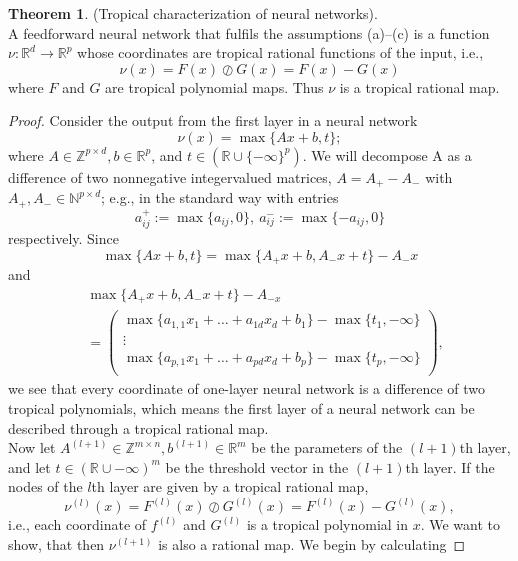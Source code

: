 \documentclass{article}
\theoremstyle{definition}
\newtheorem{theorem}{Theorem}[section]
\begin{document}
\begin{theorem}\hspace{1sp}\cite{zhang2018tropical}
\label{teo:trop_char_of_neur_net}
(Tropical characterization of neural networks). \\
A feedforward neural network that fulfils the assumptions (a)–(c) is a function $\nu : \mathbb{R}^{d} \to \mathbb{R}^{p}$ whose coordinates are tropical rational functions of the input, i.e.,
$$ \nu(x) = F(x) \oslash G(x) = F(x) - G(x) $$
where $F$ and $G$ are tropical polynomial maps. Thus $\nu$ is a tropical rational map.
\end{theorem}
\begin{proof}Consider the output from the first layer in a neural network
$$ \nu(x) = \max \{ Ax+b, t \}; $$
where $A \in \mathbb{Z}^{p \times d}, b \in \mathbb{R}^{p}$, and $t \in (\mathbb{R} \cup \{ - \infty \}^{p})$. We will
decompose A as a difference of two nonnegative integervalued matrices, $A = A_{+} - A_{-}$ with $A_{+},A_{-} \in \mathbb{N}^{p \times d}$; e.g., in the standard way with entries
$$ a^{+}_{ij} := \max \{ a_{ij}, 0 \}, \ a^{-}_{ij} := \max \{ -a_{ij}
 , 0\} $$
respectively. Since
$$ \max \{ Ax + b, t \} = \max \{ A_{+}x+b, A_{-}x+t \} - A_{-}x$$
and
\begin{align*}
&\max \{ A_{+}x+b, A_{-}x+t \} - A_{-x} \\ &= 
 \begin{pmatrix}
  \max\{a_{1,1}x_{1} + \dots + a_{1d}x_{d} + b_1\} - \max\{t_{1},-\infty\}  \\
  \vdots \\
  \max\{a_{p,1}x_{1} + \dots + a_{pd}x_{d} + b_p\} - \max\{t_{p},-\infty\}  \\ 
 \end{pmatrix},
\end{align*}
we see that every coordinate of one-layer neural network
is a difference of two tropical polynomials, which means the first layer of a neural network can be described through a tropical rational map. \\
Now let $A^{(l+1)} \in \mathbb{Z}^{m \times n}, b^{(l+1)} \in \mathbb{R}^{m}$ be the parameters of the $(l+1)$th layer, and let $t \in (\mathbb{R} \cup {- \infty})^{m}$ be the threshold vector in the $(l+1)$th layer. If the nodes of the $l$th layer are given by a tropical rational map,
$$ \nu^{(l)}(x) = F^{(l)}(x) \oslash G^{(l)}(x) = F^{(l)}(x)-G^{(l)}(x),$$
i.e., each coordinate of $f^{(l)}$ and $G^{(l)}$ is a tropical polynomial in $x$. We want to show, that then $\nu^{(l+1)}$ is also a rational map. We begin by calculating

\end{proof}
\end{document}
